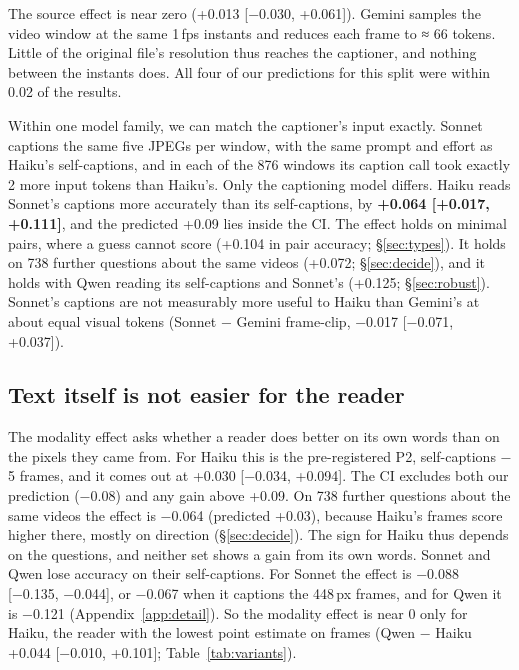 \documentclass[11pt]{article}
\begin{document}
The source effect is near zero (+0.013 [−0.030, +0.061]). Gemini samples the video window at the same 1\,fps instants and reduces each frame to ≈ 66 tokens. Little of the original file's resolution thus reaches the captioner, and nothing between the instants does. All four of our predictions for this split were within 0.02 of the results.

Within one model family, we can match the captioner's input exactly. Sonnet captions the same five JPEGs per window, with the same prompt and effort as Haiku's self-captions, and in each of the 876 windows its caption call took exactly 2 more input tokens than Haiku's. Only the captioning model differs. Haiku reads Sonnet's captions more accurately than its self-captions, by \textbf{+0.064 [+0.017, +0.111]}, and the predicted +0.09 lies inside the CI. The effect holds on minimal pairs, where a guess cannot score (+0.104 in pair accuracy; \S\ref{sec:types}). It holds on 738 further questions about the same videos (+0.072; \S\ref{sec:decide}), and it holds with Qwen reading its self-captions and Sonnet's (+0.125; \S\ref{sec:robust}). Sonnet's captions are not measurably more useful to Haiku than Gemini's at about equal visual tokens (Sonnet − Gemini frame-clip, −0.017 [−0.071, +0.037]).

\subsection{Text itself is not easier for the reader}
\label{sec:modality}

The modality effect asks whether a reader does better on its own words than on the pixels they came from. For Haiku this is the pre-registered P2, self-captions − 5 frames, and it comes out at +0.030 [−0.034, +0.094]. The CI excludes both our prediction (−0.08) and any gain above +0.09. On 738 further questions about the same videos the effect is −0.064 (predicted +0.03), because Haiku's frames score higher there, mostly on direction (\S\ref{sec:decide}). The sign for Haiku thus depends on the questions, and neither set shows a gain from its own words. Sonnet and Qwen lose accuracy on their self-captions. For Sonnet the effect is −0.088 [−0.135, −0.044], or −0.067 when it captions the 448\,px frames, and for Qwen it is −0.121 (Appendix~\ref{app:detail}). So the modality effect is near 0 only for Haiku, the reader with the lowest point estimate on frames (Qwen − Haiku +0.044 [−0.010, +0.101]; Table~\ref{tab:variants}).
\end{document}
